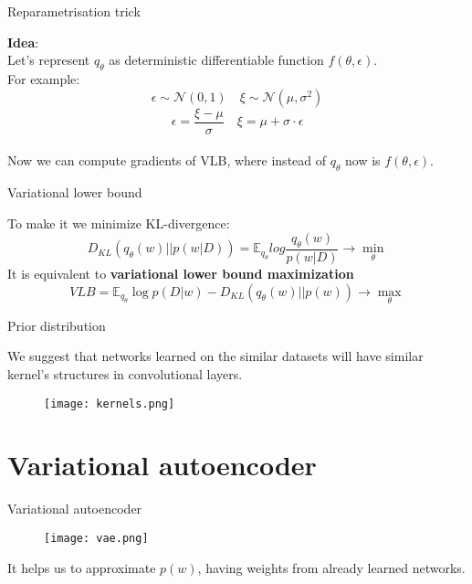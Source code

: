 \documentclass[19pt]{beamer}
\begin{document}
\begin{frame}{Reparametrisation trick}

\textbf{Idea}:\\

Let's represent $q_{\theta}$ as deterministic differentiable function $f(\theta, \epsilon)$.\\
For example:\\
$$
\epsilon \sim \mathcal{N}(0, 1) \quad
\xi \sim \mathcal{N}(\mu, \sigma^{2})
$$
$$
\epsilon = \frac{\xi - \mu}{\sigma} \quad \xi = \mu + \sigma \cdot \epsilon 
$$
\\
Now we can compute gradients of VLB, where instead of $q_{\theta}$ now is $f(\theta, \epsilon)$.

\end{frame}

\begin{frame}{Variational lower bound}

To make it we minimize KL-divergence:\\
$$
D_{KL}(q_{\theta}(w) \vert \vert p(w \vert D)) = \mathbb{E}_{q_{\theta}}log\frac{q_{\theta}(w)}{p(w \vert  D)} \rightarrow \min_{\theta}
$$ 
It is equivalent to \textbf{variational lower bound maximization}
$$
VLB = \mathbb{E}_{q_{\theta}} \log p(D \vert w) - D_{KL}(q_{\theta}(w) \vert \vert p(w)) \rightarrow \max_{\theta}
$$
\end{frame}

\begin{frame}{Prior distribution}

We suggest that networks learned on the similar datasets will have similar kernel's structures in convolutional layers.\\

\begin{figure}
    \centering
    \texttt{[image: kernels.png]}
    \label{fig:my_label}
\end{figure}

\end{frame}

\section{Variational autoencoder}

\begin{frame}{Variational autoencoder}

\begin{figure}
    \centering
    \texttt{[image: vae.png]}
    \label{fig:my_label}
\end{figure}

It helps us to approximate $p(w)$, having weights from already learned networks.

\end{frame}
\end{document}
